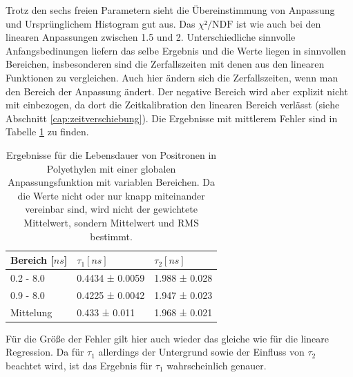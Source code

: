 \documentclass[a4paper,12pt]{article}
\begin{document}
Trotz den sechs freien Parametern sieht die Übereinstimmung von Anpassung und Ursprünglichem
Histogram gut aus. Das $χ²/\text{NDF}$ ist wie auch bei den linearen Anpassungen zwischen 1.5 und 2.
Unterschiedliche sinnvolle Anfangsbedinungen liefern das selbe Ergebnis und die Werte liegen in
sinnvollen Bereichen, insbesonderen sind die Zerfallszeiten mit denen aus den linearen Funktionen zu
vergleichen.
Auch hier ändern sich die Zerfallszeiten, wenn man den Bereich der Anpassung ändert. Der negative
Bereich wird aber explizit nicht mit einbezogen, da dort die Zeitkalibration den linearen Bereich
verlässt (siehe Abschnitt \ref{cap:zeitverschiebung}).
Die Ergebnisse mit mittlerem Fehler sind in Tabelle \ref{tab:globalPoly} zu finden.
\begin{table}[h]
	\begin{tabular}{l |l l}
		Bereich [$\si{ns}$] & $τ_1 [\si{ns}]$ & $τ_2 [\si{ns}]$ \\
		\hline
		0.2 - 8.0 & 0.4434 ± 0.0059 &1.988 ± 0.028\\
		0.9 - 8.0 & 0.4225 ± 0.0042 & 1.947 ± 0.023\\
		\hline
		\hline
		Mittelung & 0.433 ± 0.011 & 1.968 ± 0.021
	\end{tabular}
	\centering
	\caption{Ergebnisse für die Lebensdauer von Positronen in Polyethylen mit einer globalen
	Anpassungsfunktion mit variablen Bereichen. Da die Werte nicht oder nur knapp miteinander
		vereinbar sind, wird nicht der gewichtete Mittelwert, sondern Mittelwert und RMS bestimmt.}
	\label{tab:globalPoly}
\end{table}

Für die Größe der Fehler gilt hier auch wieder das gleiche wie für die lineare Regression. Da für
$τ_1$ allerdings der Untergrund sowie der Einfluss von $τ_2$ beachtet wird, ist das Ergebnis für
$τ_1$ wahrscheinlich genauer.
\end{document}
